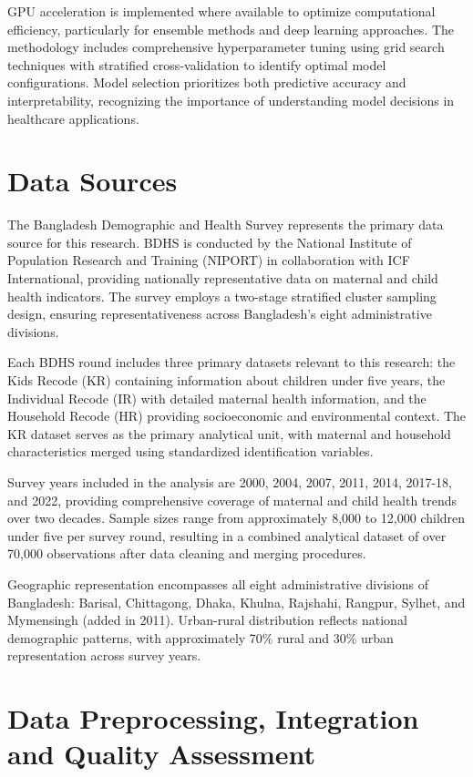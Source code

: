 \documentclass[12pt]{report}
\begin{document}
GPU acceleration is implemented where available to optimize computational efficiency, particularly for ensemble methods and deep learning approaches. The methodology includes comprehensive hyperparameter tuning using grid search techniques with stratified cross-validation to identify optimal model configurations. Model selection prioritizes both predictive accuracy and interpretability, recognizing the importance of understanding model decisions in healthcare applications.

\section{Data Sources}

The Bangladesh Demographic and Health Survey represents the primary data source for this research. BDHS is conducted by the National Institute of Population Research and Training (NIPORT) in collaboration with ICF International, providing nationally representative data on maternal and child health indicators. The survey employs a two-stage stratified cluster sampling design, ensuring representativeness across Bangladesh's eight administrative divisions.

Each BDHS round includes three primary datasets relevant to this research: the Kids Recode (KR) containing information about children under five years, the Individual Recode (IR) with detailed maternal health information, and the Household Recode (HR) providing socioeconomic and environmental context. The KR dataset serves as the primary analytical unit, with maternal and household characteristics merged using standardized identification variables.

Survey years included in the analysis are 2000, 2004, 2007, 2011, 2014, 2017-18, and 2022, providing comprehensive coverage of maternal and child health trends over two decades. Sample sizes range from approximately 8,000 to 12,000 children under five per survey round, resulting in a combined analytical dataset of over 70,000 observations after data cleaning and merging procedures.

Geographic representation encompasses all eight administrative divisions of Bangladesh: Barisal, Chittagong, Dhaka, Khulna, Rajshahi, Rangpur, Sylhet, and Mymensingh (added in 2011). Urban-rural distribution reflects national demographic patterns, with approximately 70\% rural and 30\% urban representation across survey years.

\section{Data Preprocessing, Integration and Quality Assessment}
\end{document}
